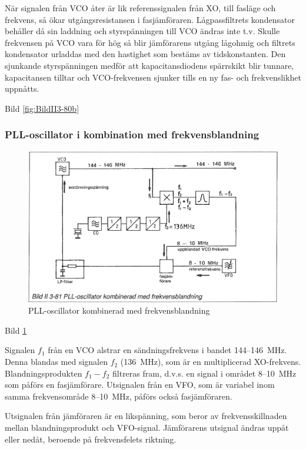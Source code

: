 När signalen från VCO åter är lik referenssignalen från XO, till
fasläge och frekvens, så ökar utgångsresistansen i
fasjämföraren. Lågpassfiltrets kondensator behåller då sin laddning
och styrspänningen till VCO ändras inte t.v. Skulle frekvensen på VCO
vara för hög så blir jämförarens utgång lågohmig och filtrets
kondensator urladdas med den hastighet som bestäms av tidskonstanten.
Den sjunkande styrspänningen medför att kapacitansdiodens
spärrskikt blir tunnare, kapacitansen tilltar och VCO-frekvensen
sjunker tills en ny fas- och frekvenslikhet uppnåtts.

Bild \ref{fig:BildII3-80b}

\subsubsection{PLL-oscillator i kombination med frekvensblandning}

\begin{figure}
\includegraphics[width=\textwidth]{images/bild_2_3-81}
\caption{PLL-oscillator kombinerad med frekvensblandning}
\label{fig:BildII3-81}
\end{figure}

Bild \ref{fig:BildII3-81}

Signalen \(f_1\) från en VCO alstrar en sändningsfrekvens i bandet
144--146~MHz. Denna blandas med signalen \(f_2\) (136~MHz), som är en
multiplicerad XO-frekvens. Blandningsprodukten \(f_1 - f_2\) filtreras
fram, d.v.s. en signal i området 8--10~MHz som påförs en fasjämförare.
Utsignalen från en VFO, som är variabel inom samma frekvensområde 8--10~MHz,
påförs också fasjämföraren.

Utsignalen från jämföraren är en likspänning, som beror av
frekvensskillnaden mellan blandningsprodukt och
VFO-signal. Jämförarens utsignal ändras uppåt eller nedåt, beroende på
frekvensfelets riktning.

